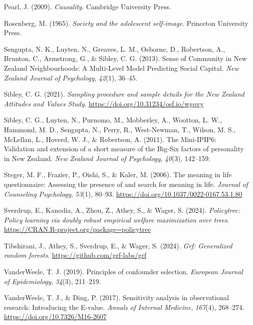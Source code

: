 \documentclass[
  single column]{article}
\newlength{\cslhangindent}
\newenvironment{CSLReferences}[2] %
 {\begin{list}{}{%
  \setlength{\itemindent}{0pt}
  \setlength{\leftmargin}{0pt}
  \setlength{\parsep}{0pt}
  \ifodd #1
   \setlength{\leftmargin}{\cslhangindent}
   \setlength{\itemindent}{-1\cslhangindent}
  \fi
  \setlength{\itemsep}{#2\baselineskip}}}
 {\end{list}}
\begin{document}
\begin{CSLReferences}{1}{0}
Pearl, J. (2009). \emph{Causality}. Cambridge University Press.

Rosenberg, M. (1965). \emph{Society and the adolescent self-image}.
Princeton University Press.

Sengupta, N. K., Luyten, N., Greaves, L. M., Osborne, D., Robertson, A.,
Brunton, C., Armstrong, G., \& Sibley, C. G. (2013). Sense of Community
in {N}ew {Z}ealand Neighbourhoods: A Multi-Level Model Predicting Social
Capital. \emph{New Zealand Journal of Psychology}, \emph{42}(1), 36--45.

Sibley, C. G. (2021). \emph{Sampling procedure and sample details for
the {N}ew {Z}ealand {A}ttitudes and {V}alues {S}tudy}.
\url{https://doi.org/10.31234/osf.io/wgqvy}

Sibley, C. G., Luyten, N., Purnomo, M., Mobberley, A., Wootton, L. W.,
Hammond, M. D., Sengupta, N., Perry, R., West-Newman, T., Wilson, M. S.,
McLellan, L., Hoverd, W. J., \& Robertson, A. (2011). The Mini-IPIP6:
Validation and extension of a short measure of the Big-Six factors of
personality in {N}ew {Z}ealand. \emph{New Zealand Journal of
Psychology}, \emph{40}(3), 142--159.

Steger, M. F., Frazier, P., Oishi, S., \& Kaler, M. (2006). The meaning
in life questionnaire: Assessing the presence of and search for meaning
in life. \emph{Journal of Counseling Psychology}, \emph{53}(1), 80--93.
\url{https://doi.org/10.1037/0022-0167.53.1.80}

Sverdrup, E., Kanodia, A., Zhou, Z., Athey, S., \& Wager, S. (2024).
\emph{Policytree: Policy learning via doubly robust empirical welfare
maximization over trees}.
\url{https://CRAN.R-project.org/package=policytree}

Tibshirani, J., Athey, S., Sverdrup, E., \& Wager, S. (2024). \emph{Grf:
Generalized random forests}. \url{https://github.com/grf-labs/grf}

VanderWeele, T. J. (2019). Principles of confounder selection.
\emph{European Journal of Epidemiology}, \emph{34}(3), 211--219.

VanderWeele, T. J., \& Ding, P. (2017). Sensitivity analysis in
observational research: Introducing the {E}-value. \emph{Annals of
Internal Medicine}, \emph{167}(4), 268--274.
\url{https://doi.org/10.7326/M16-2607}


\end{CSLReferences}
\end{document}
